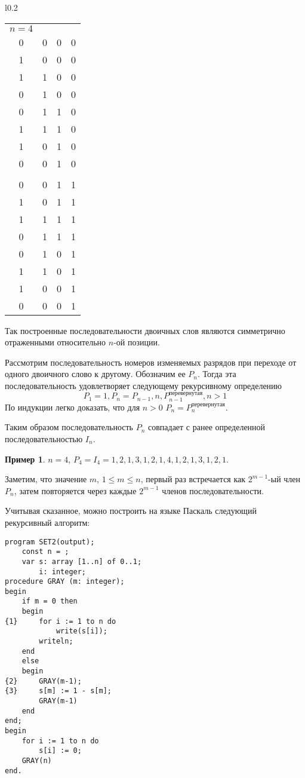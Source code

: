 \documentclass[12pt,a4paper]{article}
\theoremstyle{plain}
\theoremstyle{definition}
\newtheorem*{example}{Пример}
\theoremstyle{remark}
\begin{document}
\begin{wrapfigure}{l}{0.2\textwidth}
\begin{tabular}{cccc}
$n=4$ \\
0 & 0 & 0 & 0 \\
1 & 0 & 0 & 0 \\
1 & 1 & 0 & 0 \\
0 & 1 & 0 & 0 \\
0 & 1 & 1 & 0 \\
1 & 1 & 1 & 0 \\
1 & 0 & 1 & 0 \\
0 & 0 & 1 & 0 \\
\\
0 & 0 & 1 & 1 \\
1 & 0 & 1 & 1 \\
1 & 1 & 1 & 1 \\
0 & 1 & 1 & 1 \\
0 & 1 & 0 & 1 \\
1 & 1 & 0 & 1 \\
1 & 0 & 0 & 1 \\
0 & 0 & 0 & 1 \\
\end{tabular}
\end{wrapfigure}
Так построенные последовательности двоичных слов являются симметрично отраженными относительно $n$-ой позиции.

Рассмотрим последовательность номеров изменяемых разрядов при переходе от одного двоичного слово к другому. Обозначим ее $P_n$. Тогда эта последовательность удовлетворяет следующему рекурсивному определению 
\[ P_1 = 1, P_n = P_{n-1}, n, P_{n-1}^{\mbox{перевернутая}}, n > 1 \]
По индукции легко доказать, что для $n>0$ $P_n = P_n^{\mbox{перевернутая}}$. 

Таким образом последовательность $P_n$ совпадает с ранее определенной последовательностью $I_n$.

\begin{example}
$n = 4$, $P_4 = I_4 = 1, 2, 1, 3, 1, 2, 1, 4, 1, 2, 1, 3, 1, 2, 1$.
\end{example}

Заметим, что значение $m$, $1\le m\le n$, первый раз встречается как $2^{m-1}$-ый член $P_n$, затем повторяется через каждые $2^{m-1}$ членов последовательности.

Учитывая сказанное, можно построить на языке Паскаль следующий рекурсивный алгоритм:

\begin{verbatim}
program SET2(output);
    const n = ;
    var s: array [1..n] of 0..1;
        i: integer;
procedure GRAY (m: integer);
begin
    if m = 0 then
    begin
{1}     for i := 1 to n do
            write(s[i]);
        writeln;
    end
    else
    begin
{2}     GRAY(m-1);
{3}     s[m] := 1 - s[m];
        GRAY(m-1)
    end
end;
begin
    for i := 1 to n do
        s[i] := 0;
    GRAY(n)
end.
\end{verbatim}
\end{document}
